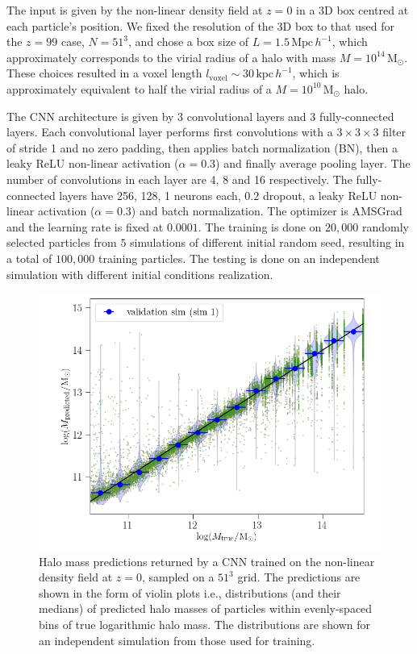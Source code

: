 \documentclass[11pt]{article}
\begin{document}
The input is given by the non-linear density field at $z=0$ in a 3D box centred at each particle's position. We fixed the resolution of the 3D box to that used for the $z=99$ case, $N=51^3$, and chose a box size of $L=1.5 \, \mathrm{Mpc} \, h^{-1}$, which approximately corresponds to the virial radius of a halo with mass $M=10^{14}\, \mathrm{M}_\odot$. These choices resulted in a voxel length $l_\mathrm{voxel} \sim 30 \, \mathrm{kpc} \, h^{-1}$, which is approximately equivalent to half the virial radius of a $M=10^{10}\, \mathrm{M}_\odot$ halo. 

The CNN architecture is given by 3 convolutional layers and 3 fully-connected layers. Each convolutional layer performs first convolutions with a $3\times3\times3$ filter of stride 1 and no zero padding, then applies batch normalization (BN), then a leaky ReLU non-linear activation ($\alpha=0.3$) and finally average pooling layer. The number of convolutions in each layer are 4, 8 and 16 respectively. The fully-connected layers have 256, 128, 1 neurons each, $0.2$ dropout, a leaky ReLU non-linear activation ($\alpha=0.3$) and batch normalization. The optimizer is AMSGrad and the learning rate is fixed at $0.0001$. The training is done on $20,000$ randomly selected particles from $5$ simulations of different initial random seed, resulting in a total of $100,000$ training particles. The testing is done on an independent simulation with different initial conditions realization. 

\begin{figure}[t]
\centering
\includegraphics[width=0.85\columnwidth]{z0/predictions_reseed1.png}
\caption{Halo mass predictions returned by a CNN trained on the non-linear density field at $z=0$, sampled on a $51^3$ grid. The predictions are shown in the form of violin plots i.e., distributions (and their medians) of predicted halo masses of particles within evenly-spaced bins of true logarithmic halo mass. The distributions are shown for an independent simulation from those used for training.}
\label{z0_predictions}
\end{figure}
\end{document}
